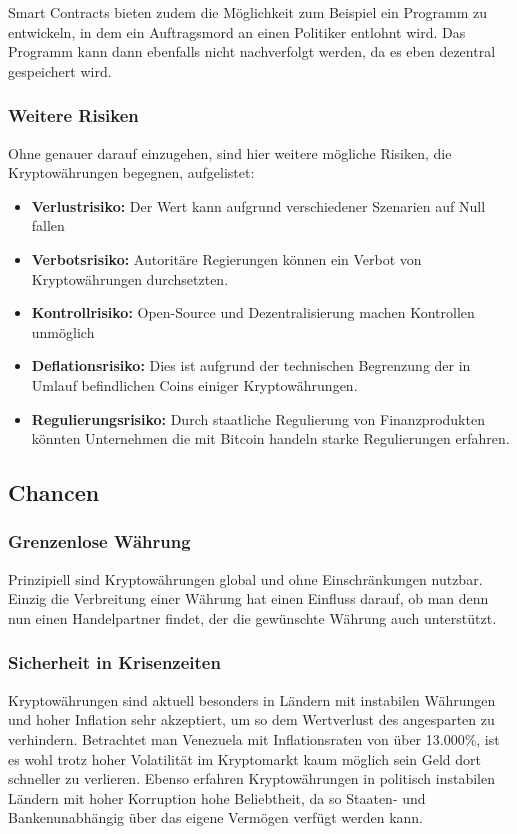 \documentclass[12pt,oneside]{article}
\begin{document}
Smart Contracts bieten zudem die Möglichkeit zum Beispiel ein Programm zu entwickeln, in dem ein Auftragsmord an einen Politiker entlohnt wird. Das Programm kann dann ebenfalls nicht nachverfolgt werden, da es eben dezentral gespeichert wird.  

\subsubsection{Weitere Risiken}
Ohne genauer darauf einzugehen, sind hier weitere mögliche Risiken, die Kryptowährungen begegnen, aufgelistet: 

\begin{itemize}
  \item \textbf{Verlustrisiko:} Der Wert kann aufgrund verschiedener Szenarien auf Null fallen
  \item \textbf{Verbotsrisiko:} Autoritäre Regierungen können ein Verbot von Kryptowährungen durchsetzten.
  \item \textbf{Kontrollrisiko:} Open-Source und Dezentralisierung machen Kontrollen unmöglich
  \item \textbf{Deflationsrisiko:} Dies ist aufgrund der technischen Begrenzung der in Umlauf befindlichen Coins einiger Kryptowährungen. 
  \item \textbf{Regulierungsrisiko:} Durch staatliche Regulierung von Finanzprodukten könnten Unternehmen die mit Bitcoin handeln starke Regulierungen erfahren.
\end{itemize}\cite{neumann2017}

\subsection{Chancen}

\subsubsection{Grenzenlose Währung}
Prinzipiell sind Kryptowährungen global und ohne Einschränkungen nutzbar. Einzig die Verbreitung einer Währung hat einen Einfluss darauf, ob man denn nun einen Handelpartner findet, der die gewünschte Währung auch unterstützt.

\subsubsection{Sicherheit in Krisenzeiten}
Kryptowährungen sind aktuell besonders in Ländern mit instabilen Währungen und hoher Inflation sehr akzeptiert, um so dem Wertverlust des angesparten zu verhindern. Betrachtet man Venezuela mit Inflationsraten von über 13.000\%, ist es wohl trotz hoher Volatilität im Kryptomarkt kaum möglich sein Geld dort schneller zu verlieren. Ebenso erfahren Kryptowährungen in politisch instabilen Ländern mit hoher Korruption hohe Beliebtheit, da so Staaten- und Bankenunabhängig über das eigene Vermögen verfügt werden kann. \cite{rosenberg2019}
\end{document}
